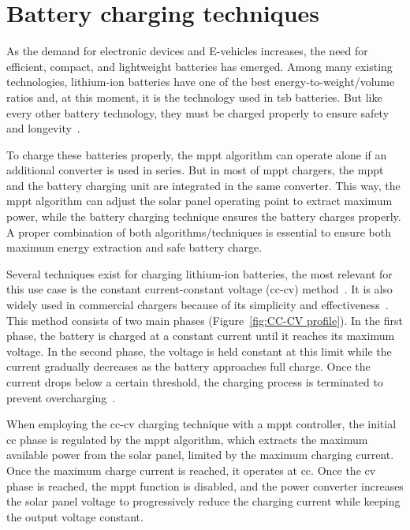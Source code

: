     
\section{Battery charging techniques}

    As the demand for electronic devices and E-vehicles increases, the need for efficient, compact, and lightweight batteries has emerged. Among many existing technologies, lithium-ion batteries have one of the best energy-to-weight/volume ratios and, at this moment, it is the technology used in \ac{tsb} batteries. But like every other battery technology, they must be charged properly to ensure safety and longevity~\cite{Charging_Algorithms_Lithium_Ion_Batteries_Overview_2012}.

    To charge these batteries properly, the \ac{mppt} algorithm can operate alone if an additional converter is used in series. But in most of \ac{mppt} chargers, the \ac{mppt} and the battery charging unit are integrated in the same converter. This way, the \ac{mppt} algorithm can adjust the solar panel operating point to extract maximum power, while the battery charging technique ensures the battery charges properly. A proper combination of both algorithms/techniques is essential to ensure both maximum energy extraction and safe battery charge.

    Several techniques exist for charging lithium-ion batteries, the most relevant for this use case is the constant current-constant voltage (\acs{cc}-\acs{cv}) method~\cite{Charging_Algorithms_Nickel_Lithium_Battery_2011}. It is also widely used in commercial chargers because of its simplicity and effectiveness~\cite{Review_Different_Charging_Techniques_Lithium_Polymer_Battery_2015}. 
     This method consists of two main phases (Figure~\ref{fig:CC-CV profile}). In the first phase, the battery is charged at a constant current until it reaches its maximum voltage. In the second phase, the voltage is held constant at this limit while the current gradually decreases as the battery approaches full charge. Once the current drops below a certain threshold, the charging process is terminated to prevent overcharging~\cite{Review_Different_Charging_Techniques_Lithium_Polymer_Battery_2015}.

     When employing the \acs{cc}-\acs{cv} charging technique with a \ac{mppt} controller, the initial \ac{cc} phase is regulated by the \ac{mppt} algorithm, which extracts the maximum available power from the solar panel, limited by the maximum charging current. Once the maximum charge current is reached, it operates at \ac{cc}. Once the \ac{cv} phase is reached, the \ac{mppt} function is disabled, and the power converter increases the solar panel voltage to progressively reduce the charging current while keeping the output voltage constant.



